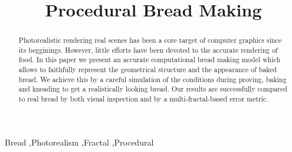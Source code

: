 \documentclass[final,5p,times]{elsarticle}
\begin{document}
\begin{frontmatter}



\title{Procedural Bread Making}


\author{}

\address{}

\begin{abstract}
Photorealistic rendering real scenes has been a core target of computer graphics since its begginings. However, little efforts have been devoted to the accurate rendering of food. In this paper we present an accurate computational bread making model which allows to faithfully represent the geometrical structure and the appearance of baked bread. We achieve this by a careful simulation of the conditions during proving, baking and kneading to get a realistically looking bread. Our results are successfully compared to real bread by both visual inspection and by a multi-fractal-based error metric.
\end{abstract}

\begin{keyword}
Bread \sep Photorealism \sep Fractal \sep Procedural


\end{keyword}

\end{frontmatter}

\linenumbers
\end{document}
